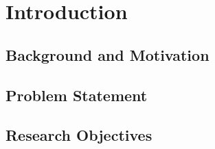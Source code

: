 \chapter{Introduction} \label{chap:chap-1}





\section{Background and Motivation}

\section{Problem Statement}

\section{Research Objectives}